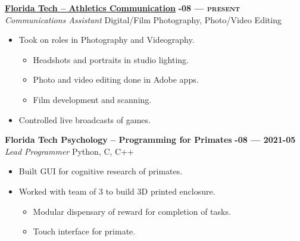 \documentclass[margin,10pt]{res}
\begin{document}
\begin{resume}
        \href{https://floridatechsports.com/}{\textbf{Florida Tech -- Athletics Communication}}
        \hfill
        \textsc{\bfseries{}-08 --- present}
        \\
        \textit{Communications Assistant}
        \hfill
        Digital/Film Photography, Photo/Video Editing
        \vspace{0.5em}
        \begin{itemize}
            \item Took on roles in Photography and Videography.
            \begin{itemize}
                \item Headshots and portraits in studio lighting.
                \item Photo and video editing done in Adobe apps.
                \item Film development and scanning.
            \end{itemize}
            \item Controlled live broadcasts of games.
        \end{itemize}

        \textbf{Florida Tech Psychology -- Programming for Primates}
        \hfill
        \textsc{\bfseries{}-08 --- 2021-05}
        \\
        \textit{Lead Programmer}
        \hfill
        Python, C, C++
        \vspace{0.5em}
        \begin{itemize}
            \item Built GUI for cognitive research of primates.
            \item Worked with team of 3 to build 3D printed enclosure.
            \begin{itemize}
                \item Modular dispensary of reward for completion of tasks.
                \item Touch interface for primate.
            \end{itemize}
        \end{itemize}


\end{resume}
\end{document}
